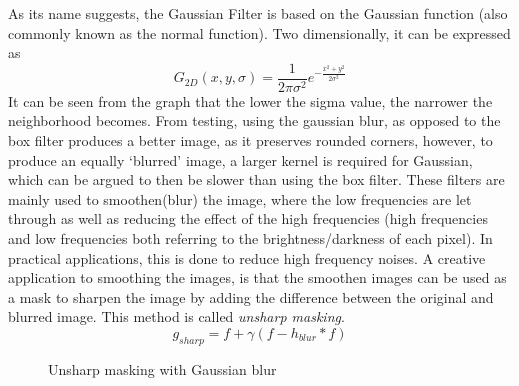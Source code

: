 \documentclass[twoside,a4paper,article]{combine}
\begin{document}
As its name suggests, the Gaussian Filter is based on the Gaussian function (also commonly known as the normal function).
Two dimensionally, it can be expressed as \cite{MISRA2020289}
\[
    G_{2D}(x, y, \sigma) = \frac{1}{2\pi\sigma^2}e^{-\frac{x^2 + y^2}{2\sigma^2}}
\]
It can be seen from the graph that the lower the sigma value, the narrower the neighborhood becomes. From testing, using the gaussian blur, as opposed to
the box filter produces a better image, as it preserves rounded corners, however, to produce an equally `blurred' image, a larger kernel is required for Gaussian, which can be argued to then be slower
than using the box filter.
These filters are mainly used to smoothen(blur) the image, where the low frequencies are let through as well as reducing the effect of the high frequencies (high frequencies and low frequencies both referring to
the brightness/darkness of each pixel). In practical applications, this is done to reduce high frequency noises.
A creative application to smoothing the images, is that the smoothen images can be used as a mask to sharpen the image by adding the difference between the original and blurred image.
This method is called \emph{unsharp masking}\cite{Szeliski_2022}.
\[
  g_{sharp} = f + \gamma(f - h_{blur} \ast f)  
\]
\begin{minipage}{\textwidth}\begin{figure}[H]
    \centering
    \caption{Unsharp masking with Gaussian blur}\label{fig:unsharp_mask}
\end{figure}\end{minipage}
\end{document}
